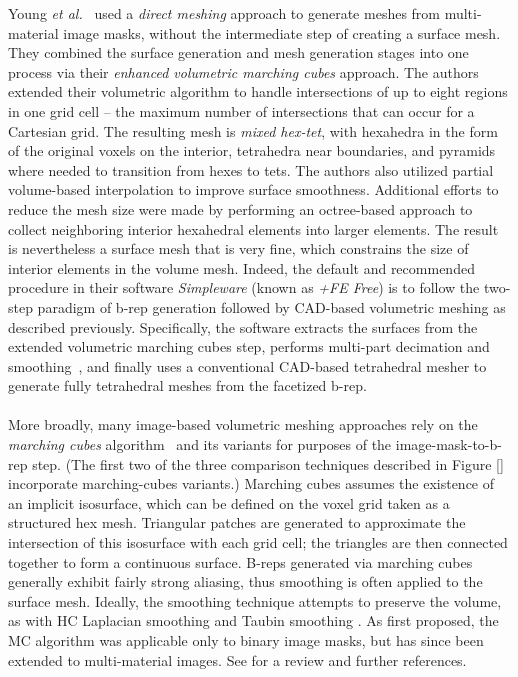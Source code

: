 Young \textit{et al.}~\cite{young_2008} used a \textit{direct meshing} approach to generate meshes from multi-material image masks, without the intermediate step of creating a surface mesh. They combined the surface generation and mesh generation stages into one process via their \textit{enhanced volumetric marching cubes} approach.  The authors extended their volumetric algorithm to handle intersections of up to eight regions in one grid cell -- the maximum number of intersections that can occur for a Cartesian grid.  The resulting mesh is \textit{mixed hex-tet}, with hexahedra in the form of the original voxels on the interior, tetrahedra near boundaries, and pyramids where needed to transition from hexes to tets. The authors also utilized partial volume-based interpolation to improve surface smoothness. Additional efforts to reduce the mesh size were made by performing an octree-based approach to collect neighboring interior hexahedral elements into larger elements.  The result is nevertheless a surface mesh that is very fine, which constrains the size of interior elements in the volume mesh.  Indeed, the default and recommended procedure in their software \textit{Simpleware} (known as \textit{+FE Free}) is to follow the two-step paradigm of b-rep generation followed by CAD-based volumetric meshing as described previously. Specifically, the software extracts the surfaces from the extended volumetric marching cubes step, performs multi-part decimation and smoothing~\cite{egst}, and finally uses a conventional CAD-based tetrahedral mesher to generate fully tetrahedral meshes from the facetized b-rep. \\ \\
%
More broadly, many image-based volumetric meshing approaches rely on the \textit{marching cubes} algorithm~\cite{lorensen_1987} and its variants for purposes of the image-mask-to-b-rep step.  (The first two of the three comparison techniques described in Figure \ref{} incorporate marching-cubes variants.)  Marching cubes assumes the existence of an implicit isosurface, which can be defined on the voxel grid taken as a structured hex mesh.  Triangular patches are generated to approximate the intersection of this isosurface with each grid cell; the triangles are then connected together to form a continuous surface. B-reps generated via marching cubes generally exhibit fairly strong aliasing, thus smoothing is often applied to the surface mesh.  Ideally, the smoothing technique attempts to preserve the volume, as with HC Laplacian smoothing\cite{vollmer_1999} and Taubin smoothing \cite{taubin1995signal, taubin_1995}.  As first proposed, the MC algorithm was applicable only to binary image masks, but has since been extended to multi-material images.  See \cite{} for a review and further references. \\ \\

